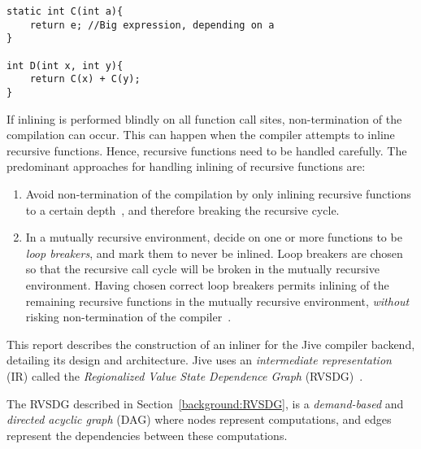 \begin{centering}
	\noindent\begin{minipage}{\textwidth}
		\begin{CenteredBox}
		\begin{lstlisting}[style=global_customcpp]
static int C(int a){
	return e; //Big expression, depending on a
}

int D(int x, int y){
	return C(x) + C(y);
}
		\end{lstlisting}
		\end{CenteredBox}
	\end{minipage}
	\label{lst:code-dup}
\end{centering}

If inlining is performed blindly on all function call sites, non-termination of
the compilation can occur. This can happen when the compiler attempts to inline
recursive functions. Hence, recursive functions need to be handled carefully.
The predominant approaches for handling inlining of recursive functions are:

\begin{enumerate}

	\item Avoid non-termination of the compilation by only inlining recursive
functions to a certain depth~\cite{GHCPaper,InlineWhenHowSerrano}, and
therefore breaking the recursive cycle.

	\item In a mutually recursive environment, decide on one or more functions
to be \textit{loop breakers}, and mark them to never be inlined. Loop breakers
are chosen so that the recursive call cycle will be broken in the mutually
recursive environment. Having chosen correct loop breakers permits inlining of
the remaining recursive functions in the mutually recursive environment,
\textit{without} risking non-termination of the
compiler~\cite{BasMscThesis,GHCPaper}.

\end{enumerate}

This report describes the construction of an inliner for the Jive compiler
backend, detailing its design and architecture. Jive uses an
\textit{intermediate representation} (IR) called the \textit{Regionalized Value
State Dependence Graph} (RVSDG)~\cite{RVSDG:HiPEACpaper}.

The RVSDG described in Section~\ref{background:RVSDG},
is a \textit{demand-based} and \textit{directed acyclic graph} (DAG) where nodes
represent computations, and edges represent the dependencies between these
computations.


